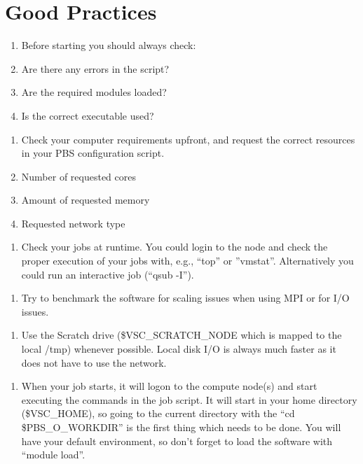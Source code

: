 \chapter{Good Practices}

\begin{enumerate}
\item  Before starting you should always check:
\item  Are there any errors in the script?
\item  Are the required modules loaded?
\item  Is the correct executable used?
\end{enumerate}

\begin{enumerate}
\item  Check your computer requirements upfront, and request the correct resources in your PBS configuration script.
\item  Number of requested cores
\item  Amount of requested memory
\item  Requested network type
\end{enumerate}

\begin{enumerate}
\item  Check your jobs at runtime. You could login to the node and check the proper execution of your jobs with, e.g., ``top'' or ''vmstat''.  Alternatively you could run an interactive job (``qsub -I'').
\end{enumerate}

\begin{enumerate}
\item  Try to benchmark the software for scaling issues when using MPI or for I/O issues.
\end{enumerate}

\begin{enumerate}
\item  Use the Scratch drive (\$VSC\_SCRATCH\_NODE which is mapped to the local /tmp) whenever possible. Local disk I/O is always much faster as it does not have to use the network.
\end{enumerate}

\begin{enumerate}
\item  When your job starts, it will logon to the compute node(s) and start executing the commands in the job script. It will start in your home directory (\$VSC\_HOME), so going to the current directory with the ``cd \$PBS\_O\_WORKDIR'' is the first thing which needs to be done.  You will have your default environment, so don't forget to load the software with ``module load''.
\end{enumerate}

